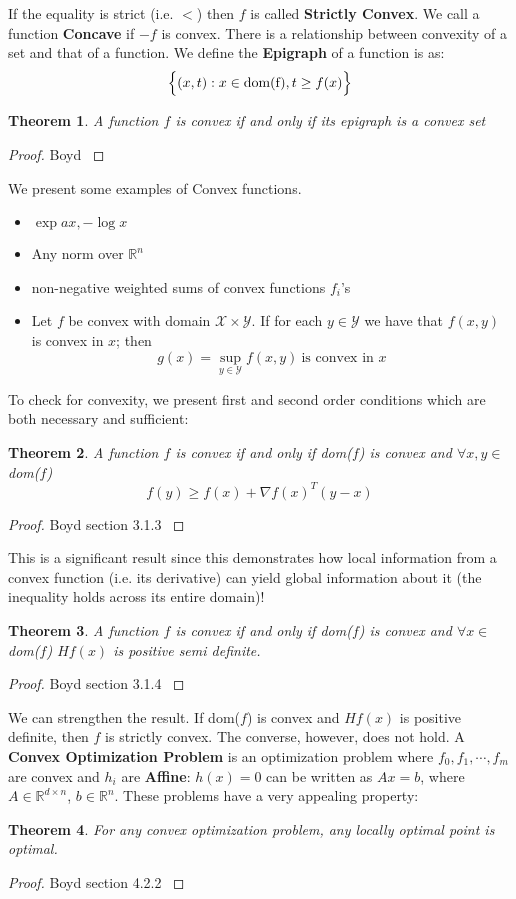 \documentclass[]{article}
\theoremstyle{mattstyle}
\newtheorem{theorem}{Theorem}[section]
\theoremstyle{definition}
\begin{document}
If the equality is strict (i.e. $<$) then $f$ is called \textbf{Strictly Convex}. We call a function \textbf{Concave} if $-f$ is convex. There is a relationship between convexity of a set and that of a function. We define the \textbf{Epigraph} of a function is as:
$$\Bigl\{ (x,t): x\in \text{dom(f)}, t\ge f(x) \Bigr\}$$
\begin{theorem}
	A function $f$ is convex if and only if its epigraph is a convex set
\end{theorem}
\begin{proof}
	Boyd \cite{Boyd:2004:CO:993483} 
\end{proof}
\newpage

We present some examples of Convex functions.
\begin{itemize}
	\item $\exp{ax}, -\log x$
	\item Any norm over $\mathbb{R}^n$
	\item non-negative weighted sums of convex functions $f_i$'s
	\item Let $f$ be convex with domain $\mathcal{X} \times \mathcal{Y}$. If for each $y \in \mathcal{Y}$ we have that $f(x,y)$ is convex in $x$; then $$ g(x) = \sup_{y \in \mathcal{Y}} f(x,y) \ \text{is convex in $x$}$$
\end{itemize}

To check for convexity, we present first and second order conditions which are both necessary and sufficient:
\begin{theorem}
	A function $f$ is convex if and only if dom($f$) is convex and $\forall x,y \in$dom($f$)
	$$ f(y) \ge f(x) + \nabla f(x)^T(y-x)$$
\end{theorem}
\begin{proof}
	Boyd section 3.1.3 \cite{Boyd:2004:CO:993483} 
\end{proof}
This is a significant result since this demonstrates how local information from a convex function (i.e. its derivative) can yield global information about it (the inequality holds across its entire domain)!

\begin{theorem}
	A function $f$ is convex if and only if dom($f$) is convex and $\forall x \in$dom($f$) $Hf(x)$ is positive semi definite.
\end{theorem}
\begin{proof}
	Boyd section 3.1.4 \cite{Boyd:2004:CO:993483} 
\end{proof}

We can strengthen the result. If dom($f$) is convex and $Hf(x)$ is positive definite, then $f$ is strictly convex. The converse, however, does not hold. A \textbf{Convex Optimization Problem} is an optimization problem where $f_0, f_1, \cdots, f_m$ are convex and $h_i$ are \textbf{Affine}: $h(x) = 0$ can be written as $Ax = b$, where $A \in \mathbb{R}^{d \times n}$, $b\in\mathbb{R}^n$. These problems have a very appealing property: 
\begin{theorem}
	For any convex optimization problem, any locally optimal point is optimal.
\end{theorem}
\begin{proof}
	Boyd section 4.2.2 \cite{Boyd:2004:CO:993483} 
\end{proof}
\end{document}
